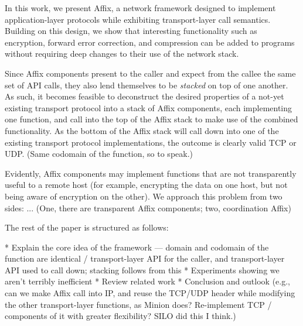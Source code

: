 In this work, we present Affix, a network framework designed to implement application-layer protocols while exhibiting transport-layer call semantics. Building on this design, we show that interesting functionality such as encryption, forward error correction, and compression can be added to programs without requiring deep changes to their use of the network stack.

Since Affix components present to the caller and expect from the callee the same set of \ac{API} calls, they also lend themselves to be \textit{stacked} on top of one another. As such, it becomes feasible to deconstruct the desired properties of a not-yet existing transport protocol into a stack of Affix components, each implementing one function, and call into the top of the Affix stack to make use of the combined functionality. As the bottom of the Affix stack will call down into one of the existing transport protocol implementations, the outcome is clearly valid TCP or UDP. (Same codomain of the function, so to speak.)

Evidently, Affix components may implement functions that are not transparently useful to a remote host (for example, encrypting the data on one host, but not being aware of encryption on the other). We approach this problem from two sides: ... (One, there are transparent Affix components; two, coordination Affix)

The rest of the paper is structured as follows:

* Explain the core idea of the framework --- domain and codomain of the function are identical / transport-layer API for the caller, and transport-layer API used to call down; stacking follows from this
* Experiments showing we aren't terribly inefficient
* Review related work
* Conclusion and outlook (e.g., can we make Affix call into IP, and reuse the TCP/UDP header while modifying the other transport-layer functions, as Minion does? Re-implement TCP / components of it with greater flexibility? SILO did this I think.)



